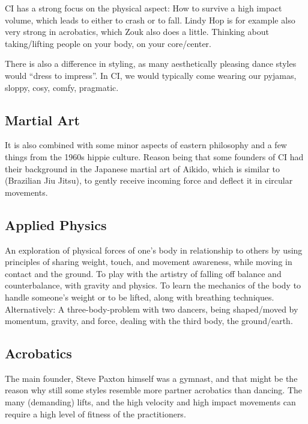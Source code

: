 CI has a strong focus on the physical aspect: How to survive a high impact volume, which leads to either to crash or to fall.
Lindy Hop is for example also very strong in acrobatics, which Zouk also does a little.
Thinking about taking/lifting people on your body, on your core/center.

There is also a difference in styling, as many aesthetically pleasing dance styles would ``dress to impress''.
In CI, we would typically come wearing our pyjamas, sloppy, cosy, comfy, pragmatic.

\subsection{Martial Art}\label{subsec:martial-art}

It is also combined with some minor aspects of eastern philosophy and a few things from the 1960s hippie culture.
Reason being that some founders of CI had their background in the Japanese martial art of Aikido, which is similar to (Brazilian Jiu Jitsu), to gently receive incoming force and deflect it in circular movements.

\subsection{Applied Physics}\label{subsec:applied-physics}

An exploration of physical forces of one's body in relationship to others by using principles of sharing weight, touch, and movement awareness, while moving in contact and the ground.
To play with the artistry of falling off balance and counterbalance, with gravity and physics.
To learn the mechanics of the body to handle someone's weight or to be lifted, along with breathing techniques.
Alternatively: A three-body-problem with two dancers, being shaped/moved by momentum, gravity, and force, dealing with the third body, the ground/earth.

\subsection{Acrobatics}\label{subsec:acrobatics}

The main founder, Steve Paxton himself was a gymnast, and that might be the reason why still some styles resemble more partner acrobatics than dancing.
The many (demanding) lifts, and the high velocity and high impact movements can require a high level of fitness of the practitioners.

